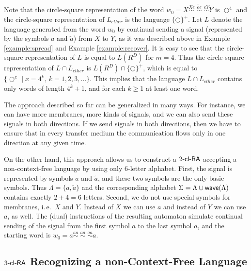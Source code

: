 Note that the circle-square representation of the word $w_0 = \overline{X \stackrel{Xe}{\sim} \; \stackrel{ee}{\sim} \; \stackrel{eY}{\sim} Y}$ is $\Circle^4$ and the circle-square representation of $L_{ether}$ is the language $\{\Circle\}^+$. Let $L$ denote the language generated from the word $w_0$ by continual sending a signal (represented by the symbols $a$ and $\tilde{a}$) from $X$ to $Y$, as it was described above  in Example \ref{example:spread} and Example \ref{example:recover}. It is easy to see that the circle-square representation of $L$ is equal to $L(R^D)$ for $m=4$. Thus the circle-square representation of $L \cap L_{ether}$ is $L(R^D)\cap \{\Circle\}^+$, which is equal to $\{\Circle^{x} \mid x = 4^k, \ k = 1, 2, 3, \ldots\}$. This implies that the language $L \cap L_{ether}$ contains only words of length $4^k + 1$, and for each $k \ge 1$ at least one word.

The approach described so far can be generalized in many ways. For instance, we can have more membranes, more kinds of signals, and we can also send these signals in both directions. If we send signals in both directions, then we have to ensure that in every transfer medium the communication flows only in one direction at any given time.

On the other hand, this approach allows us to construct a $\kclRA[2]$ accepting a non-context-free language by using only $6$-letter alphabet. First, the signal is represented by symbols $a$ and $\tilde{a}$, and these two symbols are the only basic symbols. Thus $\Lambda = \{a, \tilde{a}\}$ and the corresponding alphabet $\Sigma = \Lambda \cup \wave(\Lambda)$ contains exactly $2 + 4 = 6$ letters. Second, we do not use special symbols for membranes, i.\,e.\ $X$ and $Y$. Instead of $X$ we can use $a$ and instead of $Y$ we can use $a$, as well. The (dual) instructions of the resulting automaton simulate continual sending of the signal from the first symbol $a$ to the last symbol $a$, and the starting word is $w_0 = a \stackrel{aa}{\sim} \; \stackrel{aa}{\sim} \; \stackrel{aa}{\sim} a$.

\subsection{$\kclRA[3]$ Recognizing a non-Context-Free Language}\label{3clRA-non-CFL}

